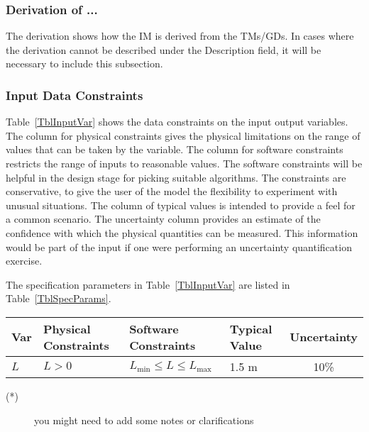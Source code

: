\documentclass[12pt]{article}
\begin{document}

\subsubsection*{Derivation of ...}

The derivation shows how the IM is derived from the TMs/GDs.  In cases where the
derivation cannot be described under the Description field, it will be necessary
to include this subsection.

\subsubsection{Input Data Constraints} \label{sec_DataConstraints}    

Table~\ref{TblInputVar} shows the data constraints on the input output
variables.  The column for physical constraints gives the physical limitations
on the range of values that can be taken by the variable.  The column for
software constraints restricts the range of inputs to reasonable values.  The
software constraints will be helpful in the design stage for picking suitable
algorithms.  The constraints are conservative, to give the user of the model the
flexibility to experiment with unusual situations.  The column of typical values
is intended to provide a feel for a common scenario.  The uncertainty column
provides an estimate of the confidence with which the physical quantities can be
measured.  This information would be part of the input if one were performing an
uncertainty quantification exercise.

The specification parameters in Table~\ref{TblInputVar} are listed in
Table~\ref{TblSpecParams}.

\begin{table}[!h]
  \caption{Input Variables} \label{TblInputVar}
  \renewcommand{\arraystretch}{1.2}
\noindent \begin{longtable*}{l l l l c} 
  \toprule
  \textbf{Var} & \textbf{Physical Constraints} & \textbf{Software Constraints} &
                             \textbf{Typical Value} & \textbf{Uncertainty}\\
  \midrule 
  $L$ & $L > 0$ & $L_{\text{min}} \leq L \leq L_{\text{max}}$ & 1.5 \si[per-mode=symbol] {\metre} & 10\%
  \\
  \bottomrule
\end{longtable*}
\end{table}

\noindent 
\begin{description}
\item[(*)] you might need to add some notes or clarifications
\end{description}
\end{document}
